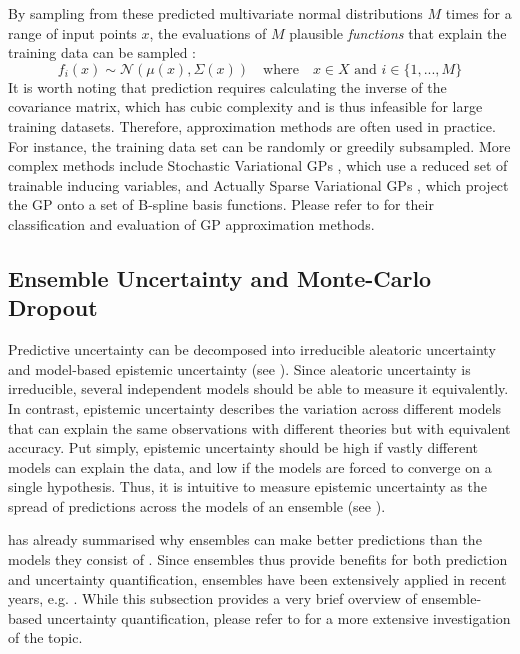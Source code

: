 \noindent By sampling from these predicted multivariate normal distributions $M$ times for a range of input points $x$, the evaluations of $M$ plausible \textit{functions} that explain the training data can be sampled \cite{gp-ml-2005}:
\begin{equation*}
    f_i(x) \sim \mathcal{N}(\mu(x), \Sigma(x)) \quad \text{where} \quad x \in X \text{ and } i \in \{1, ..., M\}
\end{equation*}
\noindent It is worth noting that prediction requires calculating the inverse of the covariance matrix, which has cubic complexity and is thus infeasible for large training datasets. Therefore, approximation methods are often used in practice. For instance, the training data set can be randomly or greedily \cite{gp-ml-2005} subsampled. More complex methods include Stochastic Variational GPs \cite{svgp-2013}, which use a reduced set of trainable inducing variables, and Actually Sparse Variational GPs \cite{asvgp-2023}, which project the GP onto a set of B-spline basis functions. Please refer to \textcite{big-data-gp-2022} for their classification and evaluation of GP approximation methods.

\subsection{Ensemble Uncertainty and Monte-Carlo Dropout} \label{txt:mc-dropout}

Predictive uncertainty can be decomposed into irreducible aleatoric uncertainty and model-based epistemic uncertainty (see ). Since aleatoric uncertainty is irreducible, several independent models should be able to measure it equivalently. In contrast, epistemic uncertainty describes the variation across different models that can explain the same observations with different theories but with equivalent accuracy. Put simply, epistemic uncertainty should be high if vastly different models can explain the data, and low if the models are forced to converge on a single hypothesis. Thus, it is intuitive to measure epistemic uncertainty as the spread of predictions across the models of an ensemble (see ).

\newpar {} has already summarised why ensembles can make better predictions than the models they consist of \cite{ml-ensembles-2000}. Since ensembles thus provide benefits for both prediction and uncertainty quantification, ensembles have been extensively applied in recent years, e.g. \cite{mc-dropout-2016, deep-ensembles-2017, ensemble-uncertainty-2021, ensemble-diversity-2015, ensemble-uncertainty-ood-2021}. While this subsection provides a very brief overview of ensemble-based uncertainty quantification, please refer to \textcite{ensemble-uncertainty-2021} for a more extensive investigation of the topic.

